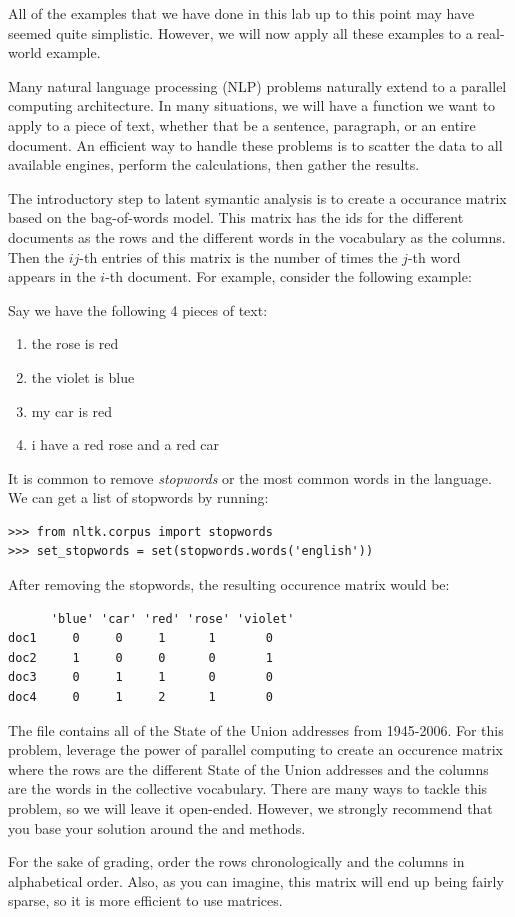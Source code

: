 \begin{problem}
All of the examples that we have done in this lab up to this point may have seemed quite simplistic. However, we will now apply all these examples to a real-world example.

Many natural language processing (NLP) problems naturally extend to a parallel computing architecture. In many situations, we will have a function we want to apply to a piece of text, whether that be a sentence, paragraph, or an entire document. An efficient way to handle these problems is to scatter the data to all available engines, perform the calculations, then gather the results.

The introductory step to latent symantic analysis is to create a occurance matrix based on the bag-of-words model. This matrix has the ids for the different documents as the rows and the different words in the vocabulary as the columns. Then the $ij$-th entries of this matrix is the number of times the $j$-th word appears in the $i$-th document. For example, consider the following example:

Say we have the following 4 pieces of text:
\begin{enumerate}
    \item the rose is red
    \item the violet is blue
    \item my car is red
    \item i have a red rose and a red car
\end{enumerate}

It is common to remove \emph{stopwords} or the most common words in the language. We can get a list of stopwords by running:
\begin{lstlisting}
>>> from nltk.corpus import stopwords
>>> set_stopwords = set(stopwords.words('english'))
\end{lstlisting}

After removing the stopwords, the resulting occurence matrix would be:
\begin{lstlisting}
      'blue' 'car' 'red' 'rose' 'violet'
doc1     0     0     1      1       0
doc2     1     0     0      0       1
doc3     0     1     1      0       0
doc4     0     1     2      1       0
\end{lstlisting}

The  file contains all of the State of the Union addresses from 1945-2006. For this problem, leverage the power of parallel computing to create an occurence matrix where the rows are the different State of the Union addresses and the columns are the words in the collective vocabulary. There are many ways to tackle this problem, so we will leave it open-ended. However, we strongly recommend that you base your solution around the  and  methods.

For the sake of grading, order the rows chronologically and the columns in alphabetical order. Also, as you can imagine, this matrix will end up being fairly sparse, so it is more efficient to use  matrices.
\end{problem}
